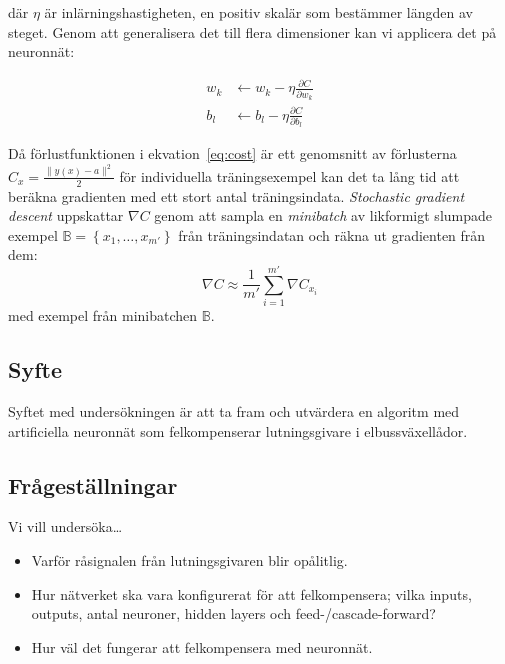där $ \eta $ är inlärningshastigheten,
en positiv skalär som bestämmer längden av steget.
Genom att generalisera det till flera dimensioner kan vi
applicera det på neuronnät:

\begin{align}
	w_k &\leftarrow w_k - \eta \frac{\partial C}{\partial w_k} \\
	b_l &\leftarrow b_l - \eta \frac{\partial C}{\partial b_l}
\end{align}

Då förlustfunktionen i ekvation~\eqref{eq:cost} är ett genomsnitt av
förlusterna $ C_x = \frac{\lVert y(x) - a \rVert^2}{2} $ för individuella träningsexempel
kan det ta lång tid att beräkna gradienten med ett stort antal träningsindata.
\emph{Stochastic gradient descent} uppskattar $ \nabla C $ genom att
sampla en \emph{minibatch} av likformigt slumpade exempel
$ \mathbb{B} = \left\{ x_1, \dotsc, x_{m'} \right\} $ från träningsindatan
och räkna ut gradienten från dem:
\begin{equation}
	\nabla C \approx \frac{1}{m'} \sum^{m'}_{i=1} \nabla C_{x_i}
\end{equation}
med exempel från minibatchen $ \mathbb{B} $.

\subsection{Syfte}
Syftet med undersökningen är att ta fram och utvärdera en algoritm med
artificiella neuronnät som felkompenserar lutningsgivare i elbussväxellådor.

\subsection{Frågeställningar}
Vi vill undersöka\ldots
\begin{itemize}
	\item Varför råsignalen från lutningsgivaren blir opålitlig.
	\item Hur nätverket ska vara konfigurerat för att felkompensera; vilka inputs,
		outputs, antal neuroner, hidden layers och feed-/cascade-forward?
	\item Hur väl det fungerar att felkompensera med neuronnät.
\end{itemize}
